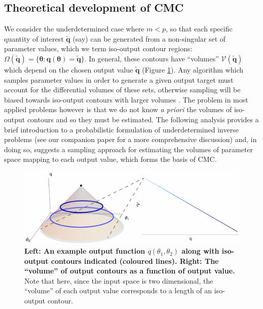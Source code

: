 \subsection{Theoretical development of CMC}
We consider the underdetermined case where $m<p$, so that each specific quantity of interest $\tilde{\boldsymbol{q}}$ (say) can be generated from a non-singular set of parameter values, which we term iso-output contour regions: $\Omega(\tilde{\boldsymbol{q}}) = \{\boldsymbol{\theta}: \boldsymbol{q}(\boldsymbol{\theta}) = \tilde{\boldsymbol{q}}\}$. In general, these contours have ``volumes'' $\mathcal{V}(\tilde{\boldsymbol{q}})$ which depend on the chosen output value $\tilde{\boldsymbol{q}}$ (Figure \ref{fig:contour_volumes}). Any algorithm which samples parameter values in order to generate a given output target must account for the differential volumes of these sets, otherwise sampling will be biased towards iso-output contours with larger volumes \cite{lambert2018inverse}. The problem in most applied problems however is that we do not know \textit{a priori} the volumes of iso-output contours and so they must be estimated. The following analysis provides a brief introduction to a probabilistic formulation of underdetermined inverse problems (see our companion paper \cite{lambert2018inverse} for a more comprehensive discussion) and, in doing so, suggests a sampling approach for estimating the volumes of parameter space mapping to each output value, which forms the basis of CMC.

\begin{figure}[H]
	\centerline{\includegraphics[width=\textwidth]{../figures/contour_volumes_redux.pdf}}
	\caption{\textbf{Left: An example output function $q(\theta_1,\theta_2)$ along with iso-output contours indicated (coloured lines). Right: The ``volume'' of output contours as a function of output value.} Note that here, since the input space is two dimensional, the ``volume'' of each output value corresponds to a length of an iso-output contour.}
	\label{fig:contour_volumes}
\end{figure}

